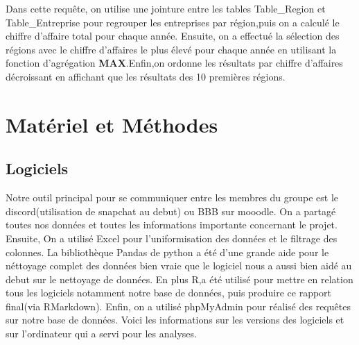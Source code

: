 \documentclass[mstat,12pt]{unswthesis}
\begin{document}
\medskip

Dans cette requête, on utilise une jointure entre les tables
Table\_Region et Table\_Entreprise pour regrouper les entreprises par
région,puis on a calculé le chiffre d'affaire total pour chaque année.
Ensuite, on a effectué la sélection des régions avec le chiffre
d'affaires le plus élevé pour chaque année en utilisant la fonction
d'agrégation \textbf{MAX}.Enfin,on ordonne les résultats par chiffre
d'affaires décroissant en affichant que les résultats des 10 premières
régions.

\bigskip

\hypertarget{matuxe9riel-et-muxe9thodes}{%
\chapter{Matériel et Méthodes}\label{matuxe9riel-et-muxe9thodes}}

\hypertarget{logiciels}{%
\section{Logiciels}\label{logiciels}}

Notre outil principal pour se communiquer entre les membres du groupe
est le discord(utilisation de snapchat au debut) ou BBB sur mooodle. On
a partagé toutes nos données et toutes les informations importante
concernant le projet. Ensuite, On a utilisé Excel pour l'uniformisation
des données et le filtrage des colonnes. La bibliothèque Pandas de
python a été d'une grande aide pour le néttoyage complet des données
bien vraie que le logiciel nous a aussi bien aidé au debut sur le
nettoyage de données. En plus R,a été utilisé pour mettre en relation
tous les logiciels notamment notre base de données, puis produire ce
rapport final(via RMarkdown). Enfin, on a utilisé phpMyAdmin pour
réalisé des requêtes sur notre base de données. \enspace Voici les
informations sur les versions des logiciels et sur l'ordinateur qui a
servi pour les analyses. \medskip
\end{document}

